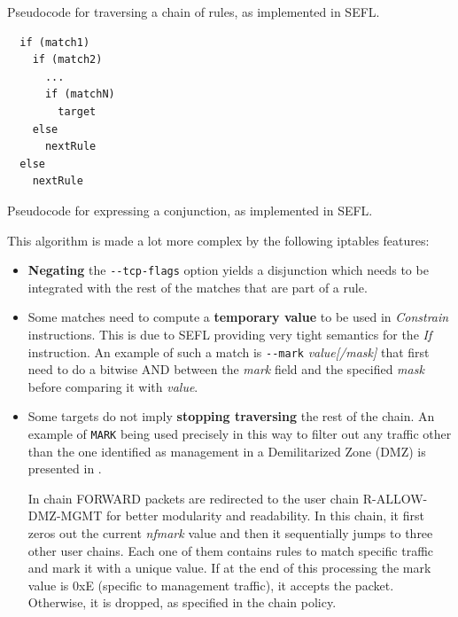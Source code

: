 {\begin{minipage}[t]{.45\textwidth}
\begin{listing}[H]
    \caption{Pseudocode for traversing a chain of rules, as implemented in
    SEFL.}
    \label{algo:if-then-else}
  \end{listing}
\end{minipage}\hfill
\begin{minipage}[t]{.45\textwidth}
  \begin{listing}[H]
    \lstset{numbers=none, frame=single}
    \begin{lstlisting}
  if (match1)
    if (match2)
      ...
      if (matchN)
        target
    else
      nextRule
  else
    nextRule
    \end{lstlisting}

    \caption{Pseudocode for expressing a conjunction, as implemented in SEFL.}
    \label{algo:if-then-else2}
  \end{listing}
\end{minipage}

This algorithm is made a lot more complex by the following iptables features:
\begin{itemize}
  \item \textbf{Negating} the \lstinline{--tcp-flags} option yields a
    disjunction which needs to be integrated with the rest of the matches
    that are part of a rule.
  \item Some matches need to compute a \textbf{temporary value} to be used in
    \emph{Constrain} instructions. This is due to SEFL providing very tight
    semantics for the \emph{If} instruction.  An example of such a match is
    \lstinline{--mark} \emph{value[/mask]} that first need to do a bitwise AND
    between the \emph{mark} field and the specified \emph{mask}
    before comparing it with \emph{value}.
  \item Some targets do not imply \textbf{stopping traversing} the rest of the
    chain.  An example of \texttt{MARK} being used precisely in this way to
    filter out any traffic other than the one identified as management in a
    Demilitarized Zone (DMZ) is presented in
    .

    In chain FORWARD packets are redirected to the user chain R-ALLOW-DMZ-MGMT
    for better modularity and readability.  In this chain, it first zeros out
    the current \emph{nfmark} value and then it sequentially jumps to three
    other user chains.  Each one of them contains rules to match specific
    traffic and mark it with a unique value.  If at the end of this processing
    the mark value is 0xE (specific to management traffic), it accepts the
    packet.  Otherwise, it is dropped, as specified in the chain policy.
\end{itemize}

}
